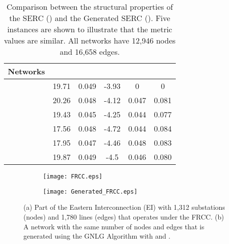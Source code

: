 \documentclass[10pt,journal]{IEEEtran}
\begin{document}
\begin{table}[t]
\centering
\vspace*{-.1cm}
\caption{Comparison between the structural properties of the SERC () and the Generated SERC (). Five instances are shown to illustrate that the metric values are similar. All networks have 12,946 nodes and 16,658 edges.}
\vspace*{-0.2cm}
\footnotesize
\begin{tabular}{|l|c|c|c|c|c|}
\hline
Networks& &&   & & \\
\hline
 & 19.71 &0.049 & -3.93 & 0&0\\
\hline
 & 20.26 & 0.048 & -4.12 &0.047& 0.081\\
\hline
 & 19.43 & 0.045 & -4.25 &0.044& 0.077\\
\hline
 & 17.56 & 0.048 & -4.72 &0.044& 0.084\\
\hline
 & 17.95 & 0.047 & -4.46 &0.048& 0.083\\
\hline
 & 19.87 & 0.049 & -4.5 & 0.046&0.080\\
\hline
\end{tabular}
\label{tb:summary_SERC}
\end{table}
\normalsize
\begin{figure}[t]
\centering
\begin{subfigure}[b]{0.24\textwidth}
\vspace*{-0.2cm}
\texttt{[image: FRCC.eps]}
\caption{}
\vspace*{0.2cm}
\end{subfigure}
\begin{subfigure}[b]{0.24\textwidth}
\vspace*{-0.2cm}
\texttt{[image: Generated\_FRCC.eps]}
\caption{}
\vspace*{0.2cm}
\end{subfigure}
\vspace{-0.4cm}
\caption{(a) Part of the  Eastern Interconnection (EI)  with  1,312 substations (nodes) and 1,780 lines (edges) that operates under the FRCC. (b) A network with the same number of nodes and edges that is generated using the GNLG Algorithm with  and .}
\label{fig:FRCC}
\end{figure}
\end{document}
